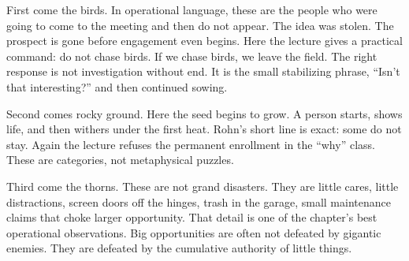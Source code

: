 \begin{figure}[t]
\centering
{}
\end{figure}

First come the birds. In operational language, these are the people who were going to come to the meeting and then do not appear. The idea was stolen. The prospect is gone before engagement even begins. Here the lecture gives a practical command: do not chase birds. If we chase birds, we leave the field. The right response is not investigation without end. It is the small stabilizing phrase, ``Isn't that interesting?'' and then continued sowing.

Second comes rocky ground. Here the seed begins to grow. A person starts, shows life, and then withers under the first heat. Rohn's short line is exact: some do not stay. Again the lecture refuses the permanent enrollment in the ``why'' class. These are categories, not metaphysical puzzles.

Third come the thorns. These are not grand disasters. They are little cares, little distractions, screen doors off the hinges, trash in the garage, small maintenance claims that choke larger opportunity. That detail is one of the chapter's best operational observations. Big opportunities are often not defeated by gigantic enemies. They are defeated by the cumulative authority of little things.

